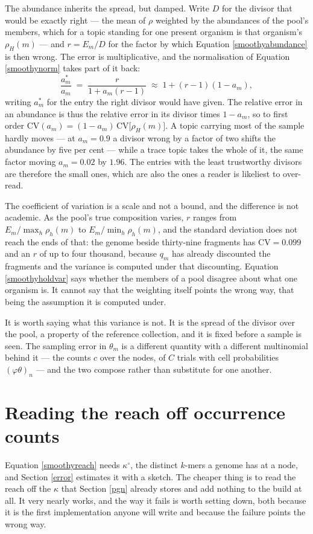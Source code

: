 \documentclass[pdflatex,sn-vancouver-num]{sn-jnl}
\begin{document}
\begin{appendices}
    The abundance inherits the spread, but damped. Write $D$ for the divisor that would be exactly
    right --- the mean of $\rho$ weighted by the abundances of the pool's members, which for a topic
    standing for one present organism is that organism's $\rho_H(m)$ --- and $r = E_m / D$ for the
    factor by which Equation \eqref{smoothyabundance} is then wrong. The error is multiplicative, and
    the normalisation of Equation \eqref{smoothynorm} takes part of it back:
    \[
        \frac{a^{*}_m}{a_m} \;=\; \frac{r}{1 + a_m (r - 1)}
        \;\approx\; 1 + (r - 1)(1 - a_m) ,
    \]
    writing $a^{*}_m$ for the entry the right divisor would have given. The relative error in an
    abundance is thus the relative error in its divisor times $1 - a_m$, so to first order
    $\mathrm{CV}(a_m) = (1 - a_m)\, \mathrm{CV}\bigl[ \rho_H(m) \bigr]$. A topic carrying most of the
    sample hardly moves --- at $a_m = 0.9$ a divisor wrong by a factor of two shifts the abundance by
    five per cent --- while a trace topic takes the whole of it, the same factor moving $a_m = 0.02$
    by $1.96$. The entries with the least trustworthy divisors are therefore the small ones, which
    are also the ones a reader is likeliest to over-read.

    The coefficient of variation is a scale and not a bound, and the difference is not academic. As
    the pool's true composition varies, $r$ ranges from $E_m / \max_h \rho_h(m)$ to
    $E_m / \min_h \rho_h(m)$, and the standard deviation does not reach the ends of that: the genome
    beside thirty-nine fragments has $\mathrm{CV} = 0.099$ and an $r$ of up to four thousand, because
    $q_m$ has already discounted the fragments and the variance is computed under that discounting.
    Equation \eqref{smoothyholdvar} says whether the members of a pool disagree about what one
    organism is. It cannot say that the weighting itself points the wrong way, that being the
    assumption it is computed under.

    It is worth saying what this variance is not. It is the spread of the divisor over the pool, a
    property of the reference collection, and it is fixed before a sample is seen. The sampling error
    in $\theta_m$ is a different quantity with a different multinomial behind it --- the counts
    $c$ over the nodes, of $C$ trials with cell probabilities $(\varphi\theta)_n$ --- and the two
    compose rather than substitute for one another.

    \section{Reading the reach off occurrence counts}\label{occreach}
    Equation \eqref{smoothyreach} needs $\kappa^{\circ}$, the distinct $k$-mers a genome has at a
    node, and Section \ref{error} estimates it with a sketch. The cheaper thing is to read the reach
    off the $\kappa$ that Section \ref{pgn} already stores and add nothing to the build at all. It
    very nearly works, and the way it fails is worth setting down, both because it is the first
    implementation anyone will write and because the failure points the wrong way.


\end{appendices}
\end{document}
